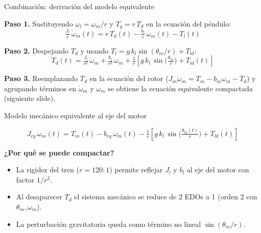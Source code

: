 \documentclass[aspectratio=169,t]{beamer}
\begin{document}
\begin{frame}{Combinación: derivación del modelo equivalente}
\vspace{2mm}

\textbf{Paso 1.} Sustituyendo $\omega_l = \omega_m/r$ y $T_q = r\,T_d$ en la ecuación del péndulo:
\begin{equation*}
\tfrac{J_l}{r}\,\dot{\omega}_m(t) = r\,T_d(t) - \tfrac{b_l}{r}\,\omega_m(t) - T_l(t)
\end{equation*}

\textbf{Paso 2.} Despejando $T_d$ y usando $T_l = g\,k_l\sin(\theta_m/r)+T_{ld}$:
\begin{equation*}
T_d(t) = \tfrac{J_l}{r^2}\,\dot{\omega}_m + \tfrac{b_l}{r^2}\,\omega_m + \tfrac{1}{r}\!\left[g\,k_l\,\sin\!\big(\tfrac{\theta_m}{r}\big) + T_{ld}(t)\right]
\end{equation*}

\textbf{Paso 3.} Reemplazando $T_d$ en la ecuación del rotor ($J_m\dot{\omega}_m=T_m-b_m\omega_m-T_d$) y agrupando términos en $\dot{\omega}_m$ y $\omega_m$ se obtiene la ecuación equivalente compactada (siguiente slide).
\end{frame}

\begin{frame}{Modelo mecánico equivalente al eje del motor}
\vspace{8mm}

\begin{equation*}
\boxed{\;\;
J_{eq}\,\dot{\omega}_m(t) = T_m(t) - b_{eq}\,\omega_m(t) - \tfrac{1}{r}\!\left[g\,k_l\,\sin\!\big(\tfrac{\theta_m(t)}{r}\big) + T_{ld}(t)\right]
\;\;}
\end{equation*}

\vspace{8mm}
\textbf{¿Por qué se puede compactar?}
\begin{itemize}
\item La rigidez del tren ($r=120{:}1$) permite reflejar $J_l$ y $b_l$ al eje del motor con factor $1/r^2$.
\item Al desaparecer $T_d$ el sistema mecánico se reduce de 2 EDOs a 1 (orden 2 con $\theta_m,\omega_m$).
\item La perturbación gravitatoria queda como término no lineal $\sin(\theta_m/r)$.
\end{itemize}
\end{frame}
\end{document}
